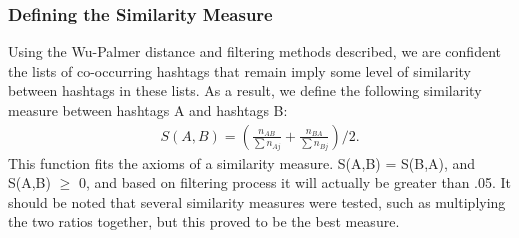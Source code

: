 \subsubsection{Defining the Similarity Measure}
Using the Wu-Palmer distance and filtering methods described, we are confident the lists of co-occurring hashtags that remain imply some level of similarity between hashtags in these lists. As a result, we define the following similarity measure between hashtags A and hashtags B:
\begin{eqnarray}
S(A,B) = ( \frac{n_{AB}}{\sum n_{Aj}} + \frac{n_{BA} } {\sum n_{Bj}}) /2 . \nonumber
\end{eqnarray}
This function fits the axioms of a similarity measure. S(A,B) = S(B,A), and S(A,B) $\geq$ 0, and based on filtering process it will actually be greater than .05. It should be noted that several similarity measures were tested, such as multiplying the two ratios together, but this proved to be the best measure.

